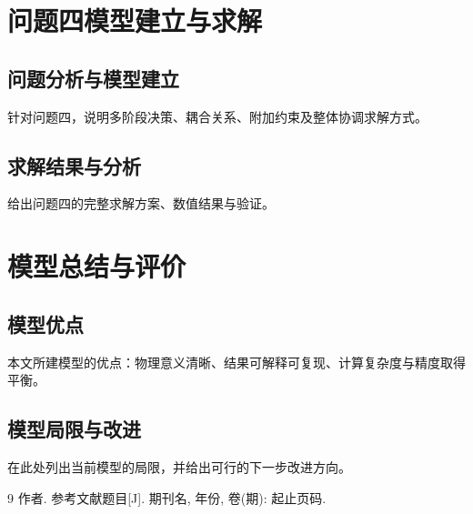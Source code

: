 \documentclass[bwprint]{gmcmthesis}
\begin{document}
\section{问题四模型建立与求解}

\subsection{问题分析与模型建立}
针对问题四，说明多阶段决策、耦合关系、附加约束及整体协调求解方式。

\subsection{求解结果与分析}
给出问题四的完整求解方案、数值结果与验证。

\section{模型总结与评价}

\subsection{模型优点}
本文所建模型的优点：物理意义清晰、结果可解释可复现、计算复杂度与精度取得平衡。

\subsection{模型局限与改进}
在此处列出当前模型的局限，并给出可行的下一步改进方向。

\begin{thebibliography}{9}
 作者. 参考文献题目[J]. 期刊名, 年份, 卷(期): 起止页码.
\end{thebibliography}
\label{body:end}
\end{document}

